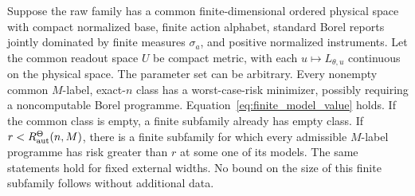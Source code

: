 \begin{theorem}\label{thm:uniform_compactness}
Suppose the raw family has a common finite-dimensional ordered physical space with compact normalized base, finite action alphabet, standard Borel reports jointly dominated by finite measures $\sigma_a$, and positive normalized instruments. Let the common readout space $U$ be compact metric, with each $u\mapsto L_{\theta,u}$ continuous on the physical space. The parameter set can be arbitrary. Every nonempty common $M$-label, exact-$n$ class has a worst-case-risk minimizer, possibly requiring a noncomputable Borel programme. Equation~\eqref{eq:finite_model_value} holds. If the common class is empty, a finite subfamily already has empty class. If $r<R^\Theta_{\mathrm{aut}}(n,M)$, there is a finite subfamily for which every admissible $M$-label programme has risk greater than $r$ at some one of its models. The same statements hold for fixed external widths. No bound on the size of this finite subfamily follows without additional data.
\end{theorem}
